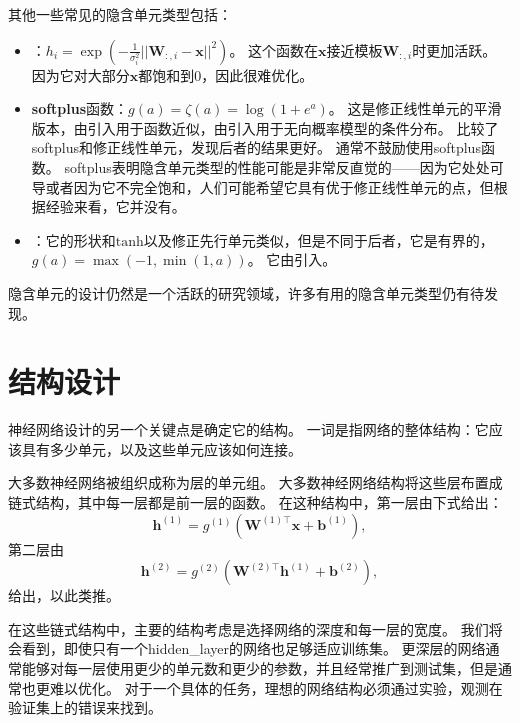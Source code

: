 其他一些常见的隐含单元类型包括：
\begin{itemize}
\item {}：$h_i = \exp \left (-\frac{1}{\sigma_i^2}|| \bm{W}_{:,i}-\bm{x}||^2 \right )$。
这个函数在$\bm{x}$接近模板$\bm{W}_{:,i}$时更加活跃。
因为它对大部分$\bm{x}$都饱和到0，因此很难优化。

\item \textbf{\gls{softplus}}函数：$g(a)=\zeta(a)=\log(1+e^a)$。
这是修正线性单元的平滑版本，由\cite{Dugas01}引入用于函数近似，由\cite{Nair-2010-small}引入用于无向概率模型的条件分布。
\cite{Glorot+al-AI-2011-small}比较了softplus和修正线性单元，发现后者的结果更好。
通常不鼓励使用softplus函数。
softplus表明隐含单元类型的性能可能是非常反直觉的——因为它处处可导或者因为它不完全饱和，人们可能希望它具有优于修正线性单元的点，但根据经验来看，它并没有。

\item {}：它的形状和$\text{tanh}$以及修正先行单元类似，但是不同于后者，它是有界的，$g(a)=\max(-1, \min(1,a))$。
它由\cite{Collobert04}引入。
\end{itemize}

隐含单元的设计仍然是一个活跃的研究领域，许多有用的隐含单元类型仍有待发现。

\section{结构设计}
\label{sec:architecture_design}

神经网络设计的另一个关键点是确定它的结构。
一词是指网络的整体结构：它应该具有多少单元，以及这些单元应该如何连接。


大多数神经网络被组织成称为层的单元组。
大多数神经网络结构将这些层布置成链式结构，其中每一层都是前一层的函数。
在这种结构中，第一层由下式给出：
\begin{equation}
\bm{h}^{(1)}= g^{(1)}\left ( \bm{W}^{(1)\top} \bm{x} + \bm{b}^{(1)}\right ),
\end{equation}
第二层由
\begin{equation}
\bm{h}^{(2)} = g^{(2)}\left ( \bm{W}^{(2)\top}\bm{h}^{(1)}+\bm{b}^{(2)} \right ),
\end{equation}
给出，以此类推。

在这些链式结构中，主要的结构考虑是选择网络的深度和每一层的宽度。
我们将会看到，即使只有一个\gls{hidden_layer}的网络也足够适应训练集。
更深层的网络通常能够对每一层使用更少的单元数和更少的参数，并且经常推广到测试集，但是通常也更难以优化。
对于一个具体的任务，理想的网络结构必须通过实验，观测在验证集上的错误来找到。

